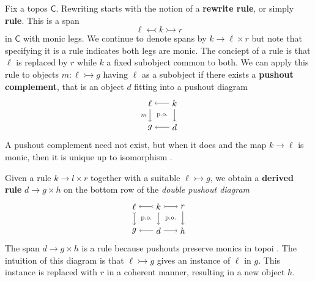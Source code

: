 \documentclass{amsart}
\newcommand{\C}{\cat{C}}
\newcommand{\defn}[1]{\textbf{#1}}
\newcommand{\cat}[1]{\mathsf{#1}}
\newcommand{\from}{\colon}
\newcommand{\monicto}{\rightarrowtail}
\newcommand{\monicgets}{\leftarrowtail}
\newcommand{\spn}[3]{#2 \to #1 \times #3}
\theoremstyle{remark}
\theoremstyle{definition}
\begin{document}
Fix a topos $ \C $.  Rewriting starts with the notion of a
\defn{rewrite rule}, or simply \defn{rule}.  This is a span
%
\[
  \ell \monicgets k \monicto r
\]
% 
in $ \C $ with monic legs. We continue to denote spans by
$ \spn{\ell}{k}{r} $ but note that specifying it is a rule indicates both
legs are monic. The conciept of a rule is that $ \ell $ is replaced by
$ r $ while $ k $ a fixed subobject common to both. We can apply
this rule to objects $ m \from \ell \monicto g $ having $ \ell $ as a
subobject if there exists a \defn{pushout complement}, that is an object $ d $ fitting into a
pushout diagram
%
\[
  \begin{tikzpicture}
    \node (l) at (0,1) {$ \ell $};
    \node (k) at (1,1) {$ k $};
    \node (g) at (0,0) {$ g $};
    \node (d) at (1,0) {$ d $};
    \draw [->] (k) to node [] {\scriptsize{$  $}} (l);
    \draw [->] (d) to node [] {\scriptsize{$  $}} (g);
    \draw [->] (l) to node [left] {\scriptsize{$ m $}} (g);
    \draw [->] (k) to node [] {\scriptsize{$  $}} (d);
    \node () at (0.5,0.5) {\scriptsize{p.o.}};
  \end{tikzpicture}
\]
% 
A pushout complement need not exist, but when it does
and the map $ k \to \ell $ is monic, then it is unique up to
isomorphism \cite[Lem.~15]{LackSobo_Adhesive}.

Given a rule $ \spn{l}{k}{r} $ together with a suitable $ \ell
\monicto g $, we obtain a \defn{derived
  rule} $ \spn{g}{d}{h} $ on the bottom row of the \emph{double pushout diagram}
%
\[
  \begin{tikzpicture}
    \node (1) at (0,1) {$ \ell $};
    \node (2) at (1,1) {$ k $};
    \node (3) at (2,1) {$ r $};
    \node (4) at (0,0) {$ g $};
    \node (5) at (1,0) {$ d $};
    \node (6) at (2,0) {$ h $};
    \draw [>->] (2) to node [] {\scriptsize{$  $}} (1);
    \draw [>->] (2) to node [] {\scriptsize{$  $}} (3);
    \draw [->] (5) to node [] {\scriptsize{$  $}} (4);
    \draw [->] (5) to node [] {\scriptsize{$  $}} (6);
    \draw [>->] (1) to node [] {\scriptsize{$  $}} (4);
    \draw [->] (2) to node [] {\scriptsize{$  $}} (5);
    \draw [->] (3) to node [] {\scriptsize{$  $}} (6);
    \node () at (0.5,0.5) {\scriptsize{p.o.}};
    \node () at (1.5,0.5) {\scriptsize{p.o.}};
  \end{tikzpicture}
\]
%
The span $ \spn{g}{d}{h} $ is a rule because pushouts preserve
monics in topoi \cite[Lem.~12]{LackSobo_Adhesive}. The intuition of
this diagram is that $ \ell \monicto g $ gives an instance of $ \ell $
in $ g $. This instance is replaced with $ r $ in a coherent manner, resulting in a new
object $ h $.  
\end{document}
